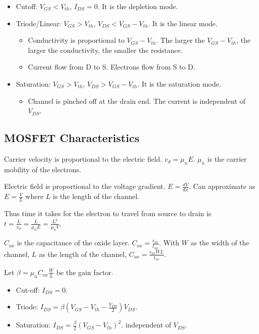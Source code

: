 \begin{itemize}
    \item Cutoff: $V_{GS} < V_{th}$, $I_{DS} = 0$. It is the depletion mode.
    \item Triode/Linear: $V_{GS} > V_{th}$, $V_{DS} < V_{GS} - V_{th}$. It is the linear mode.\begin{itemize}
        \item Conductivity is proportional to $V_{GS} - V_{th}$. The larger the $V_{GS} - V_{th}$, the larger the conductivity, the smaller the resistance.
        \item Current flow from D to S. Electrons flow from S to D.
    \end{itemize}
    \item Saturation: $V_{GS} > V_{th}$, $V_{DS} > V_{GS} - V_{th}$. It is the saturation mode.\begin{itemize}
        \item Channel is pinched off at the drain end. The current is independent of $V_{DS}$.
    \end{itemize}
\end{itemize}

\subsection{MOSFET Characteristics}

Carrier velocity is proportional to the electric field. $v_d = \mu_n E$. $\mu_n$ is the carrier mobility of the electrons.

Electric field is proportional to the voltage gradient. $E = \frac{dV}{dx}$. Can approximate as $E = \frac{V}{L}$ where $L$ is the length of the channel.

Thus time it takes for the electron to travel from source to drain is $t = \frac{L}{v_d} = \frac{L}{\mu_n E} = \frac{L^2}{\mu_n V}$.

$C_{ox}$ is the capacitance of the oxide layer. $C_{ox} = \frac{\epsilon_{ox}}{t_{ox}}$. With $W$ as the width of the channel, $L$ as the length of the channel, $C_{ox} = \frac{\epsilon_{ox} W L}{t_{ox}}$.

Let $\beta = \mu_n C_{ox} \frac{W}{L}$ be the gain factor. 

\begin{itemize}
    \item Cut-off: $I_{DS} = 0$.
    \item Triode: $I_{DS} = \beta (V_{GS} - V_{th} - \frac{V_{DS}}{2}) V_{DS}$.
    \item Saturation: $I_{DS} = \frac{\beta}{2} (V_{GS} - V_{th})^2$. independent of $V_{DS}$.
\end{itemize}

